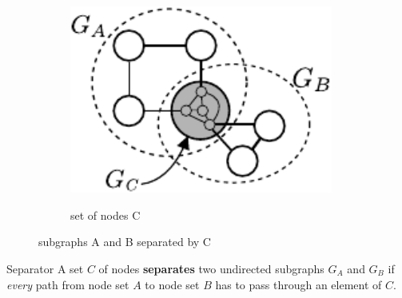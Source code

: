 \begin{frame}
{\begin{figure}[h]
\begin{subfigure}[t]{0.4\textwidth}
{         \includegraphics[width=0.95\textwidth]{img/section3_fig10_cset}
         }
         \caption{set of nodes C}
         \label{fig:setc}
     \end{subfigure}
     \caption{subgraphs A and B separated by C}
	 \label{fig:regression}
\end{figure}
}
	\slidesonly{\vspace{-2mm}}
	\begin{block}{Separator}
		A set $C$ of nodes \textbf{separates} two undirected subgraphs $G_A$ and $G_B$ 
		if \emph{every} path from node set $A$ to node set $B$ 
		has to pass through an element of $C$.
	\end{block}
\end{frame}


